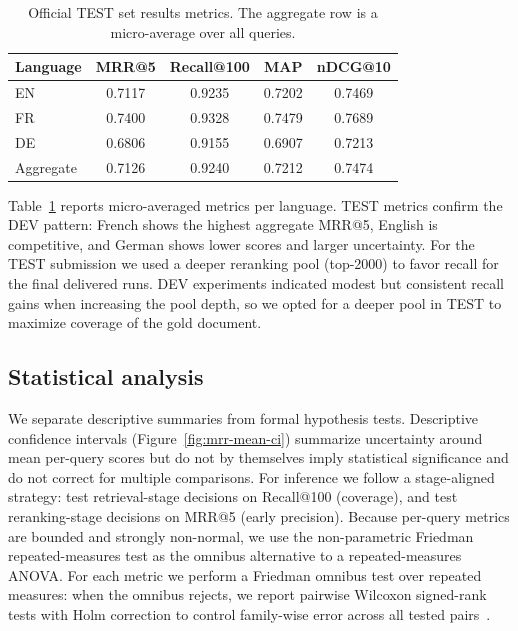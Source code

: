 \begin{table}[htbp]
    \centering
    \footnotesize
    \caption{Official TEST set results metrics. The aggregate row is a micro-average over all queries.}\label{tab:test-effectiveness}
    \begin{tabular}{l c c c c}
        \toprule
        Language & MRR@5 & Recall@100 & MAP & nDCG@10 \\
        \midrule
        EN & 0.7117 & 0.9235 & 0.7202 & 0.7469 \\
        FR & 0.7400 & 0.9328 & 0.7479 & 0.7689 \\
        DE & 0.6806 & 0.9155 & 0.6907 & 0.7213 \\
        Aggregate & 0.7126 & 0.9240 & 0.7212 & 0.7474 \\
        \bottomrule
    \end{tabular}
\end{table}

Table~\ref{tab:test-effectiveness} reports micro-averaged metrics per language. TEST metrics confirm the DEV pattern: French shows the highest aggregate MRR@5, English is competitive, and German shows lower scores and larger uncertainty. For the TEST submission we used a deeper reranking pool (top-2000) to favor recall for the final delivered runs. DEV experiments indicated modest but consistent recall gains when increasing the pool depth, so we opted for a deeper pool in TEST to maximize coverage of the gold document.

\subsection{Statistical analysis}\label{sub:statistical-analysis}

We separate descriptive summaries from formal hypothesis tests. Descriptive confidence intervals (Figure~\ref{fig:mrr-mean-ci}) summarize uncertainty around mean per-query scores but do not by themselves imply statistical significance and do not correct for multiple comparisons. For inference we follow a stage-aligned strategy: test retrieval-stage decisions on Recall@100 (coverage), and test reranking-stage decisions on MRR@5 (early precision). Because per-query metrics are bounded and strongly non-normal, we use the non-parametric Friedman repeated-measures test as the omnibus alternative to a repeated-measures ANOVA. For each metric we perform a Friedman omnibus test over repeated measures: when the omnibus rejects, we report pairwise Wilcoxon signed-rank tests with Holm correction to control family-wise error across all tested pairs~\cite{Friedman1937,Wilcoxon1945}.

